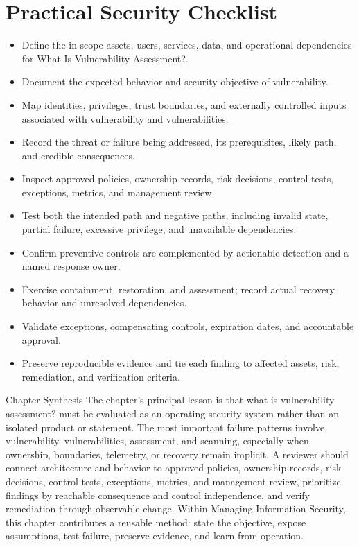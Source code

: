 \documentclass[11pt,letterpaper]{article}
\begin{document}
\section*{Practical Security Checklist}
\begin{itemize}[label=$\square$]
\item Define the in-scope assets, users, services, data, and operational dependencies for What Is Vulnerability Assessment?.
\item Document the expected behavior and security objective of vulnerability.
\item Map identities, privileges, trust boundaries, and externally controlled inputs associated with vulnerability and vulnerabilities.
\item Record the threat or failure being addressed, its prerequisites, likely path, and credible consequences.
\item Inspect approved policies, ownership records, risk decisions, control tests, exceptions, metrics, and management review.
\item Test both the intended path and negative paths, including invalid state, partial failure, excessive privilege, and unavailable dependencies.
\item Confirm preventive controls are complemented by actionable detection and a named response owner.
\item Exercise containment, restoration, and assessment; record actual recovery behavior and unresolved dependencies.
\item Validate exceptions, compensating controls, expiration dates, and accountable approval.
\item Preserve reproducible evidence and tie each finding to affected assets, risk, remediation, and verification criteria.
\end{itemize}
\begin{CornellSummaryBox}{Chapter Synthesis}
The chapter's principal lesson is that what is vulnerability assessment? must be evaluated as an operating security system rather than an isolated product or statement. The most important failure patterns involve vulnerability, vulnerabilities, assessment, and scanning, especially when ownership, boundaries, telemetry, or recovery remain implicit. A reviewer should connect architecture and behavior to approved policies, ownership records, risk decisions, control tests, exceptions, metrics, and management review, prioritize findings by reachable consequence and control independence, and verify remediation through observable change. Within Managing Information Security, this chapter contributes a reusable method: state the objective, expose assumptions, test failure, preserve evidence, and learn from operation.
\end{CornellSummaryBox}
\end{document}
